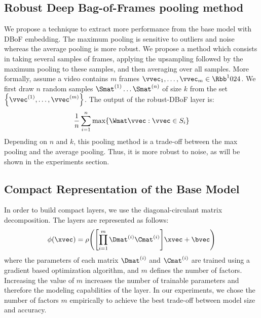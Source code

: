 \subsection{Robust Deep Bag-of-Frames pooling method}
\label{subsection:ap2-robust_deep_bag-of-frames_pooling_method}

We propose a technique to extract more performance from the base model with DBoF embedding.
The maximum pooling is sensitive to outliers and noise whereas the average pooling is more robust.
We propose a method which consists in taking several samples of frames, applying the upsampling followed by the maximum pooling to these samples, and then averaging over all samples.
More formally, assume a video contains $m$ frames $\vvec_1, \ldots, \vvec_m \in \Rbb^1024$.
We first draw $n$ random samples $\Smat^{(1)} \ldots \Smat^{(n)}$ of size $k$ from the set $\left\{ \vvec^{(1)}, \ldots, \vvec^{(m)} \right\}$.
The output of the robust-DBoF layer is:
\begin{equation}
  \frac{1}{n} \sum_{i=1}^{n} \max \left\{ \Wmat \vvec :\vvec \in S_{i} \right\} 
\end{equation}
\noindent
Depending on $n$ and $k$, this pooling method is a trade-off between the max pooling and the average pooling.
Thus, it is more robust to noise, as will be shown in the experiments section.


\subsection{Compact Representation of the Base Model}
\label{subsection:ap2-compact_representation_of_the_base_model}


In order to build compact layers, we use the diagonal-circulant matrix decomposition.
The layers are represented as follows:
\begin{equation}
  \phi(\xvec) = \rho\left(\left[\prod_{i=1}^{m} \Dmat^{(i)} \Cmat^{(i)} \right] \xvec + \bvec \right)
\end{equation}
where the parameters of each matrix $\Dmat^{(i)}$ and $\Cmat^{(i)}$ are trained using a gradient based optimization algorithm, and $m$ defines the number of factors.
Increasing the value of $m$ increases the number of trainable parameters and therefore the modeling capabilities of the layer.
In our experiments, we chose the number of factors $m$ empirically to achieve the best trade-off between model size and accuracy.

